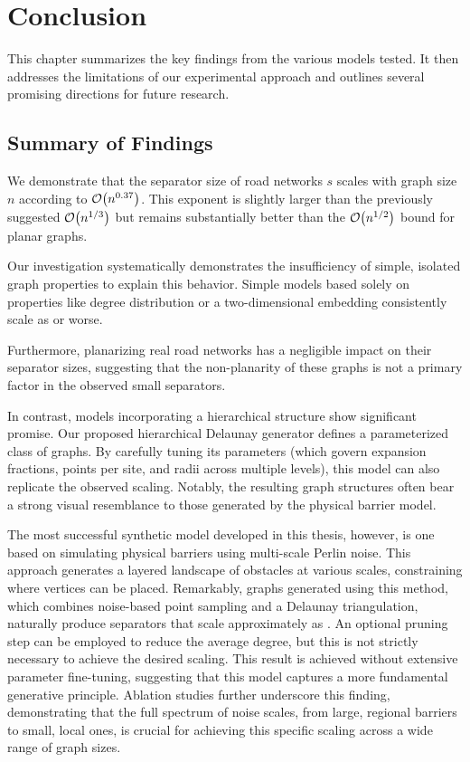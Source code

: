 \chapter{Conclusion}
\label{ch:conclusion}

This chapter summarizes the key findings from the various models tested. It then addresses the limitations of our experimental approach and outlines several promising directions for future research.

\section{Summary of Findings}
\label{sec:conclusion:summary}

We demonstrate that the separator size of road networks \(s\) scales with graph size \(n\) according to \(\mathcal{O}\!\left(n^{0.37}\right)\).
This exponent is slightly larger than the previously suggested \(\mathcal{O}\!\left(n^{1/3}\right)\) \cite{dibbelt_customizable_2016} but remains substantially better than the \(\mathcal{O}\!\left(n^{1/2}\right)\) bound for planar graphs.

Our investigation systematically demonstrates the insufficiency of simple, isolated graph properties to explain this behavior.
Simple models based solely on properties like degree distribution or a two-dimensional embedding consistently scale as  or worse.

Furthermore, planarizing real road networks has a negligible impact on their separator sizes, suggesting that the non-planarity of these graphs is not a primary factor in the observed small separators.

In contrast, models incorporating a hierarchical structure show significant promise.
Our proposed hierarchical Delaunay generator defines a parameterized class of graphs.
By carefully tuning its parameters (which govern expansion fractions, points per site, and radii across multiple levels), this model can also replicate the observed  scaling.
Notably, the resulting graph structures often bear a strong visual resemblance to those generated by the physical barrier model.

The most successful synthetic model developed in this thesis, however, is one based on simulating physical barriers using multi-scale Perlin noise.
This approach generates a layered landscape of obstacles at various scales, constraining where vertices can be placed.
Remarkably, graphs generated using this method, which combines noise-based point sampling and a Delaunay triangulation, naturally produce separators that scale approximately as .
An optional pruning step can be employed to reduce the average degree, but this is not strictly necessary to achieve the desired scaling.
This result is achieved without extensive parameter fine-tuning, suggesting that this model captures a more fundamental generative principle.
Ablation studies further underscore this finding, demonstrating that the full spectrum of noise scales, from large, regional barriers to small, local ones, is crucial for achieving this specific scaling across a wide range of graph sizes.

